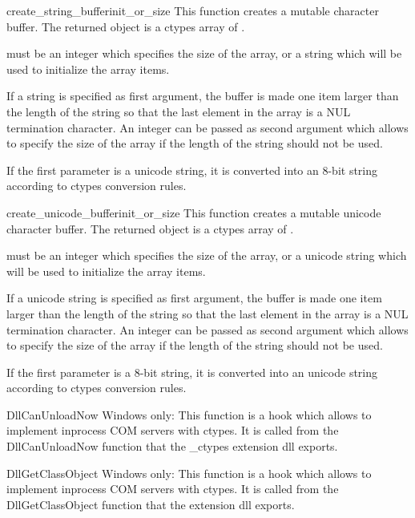 \begin{funcdesc}{create_string_buffer}{init_or_size}
This function creates a mutable character buffer. The returned
object is a ctypes array of .

 must be an integer which specifies the size of
the array, or a string which will be used to initialize the array
items.

If a string is specified as first argument, the buffer is made one
item larger than the length of the string so that the last element
in the array is a NUL termination character. An integer can be
passed as second argument which allows to specify the size of the
array if the length of the string should not be used.

If the first parameter is a unicode string, it is converted into
an 8-bit string according to ctypes conversion rules.
\end{funcdesc}

\begin{funcdesc}{create_unicode_buffer}{init_or_size}
This function creates a mutable unicode character buffer. The
returned object is a ctypes array of .

 must be an integer which specifies the size of
the array, or a unicode string which will be used to initialize
the array items.

If a unicode string is specified as first argument, the buffer is
made one item larger than the length of the string so that the
last element in the array is a NUL termination character. An
integer can be passed as second argument which allows to specify
the size of the array if the length of the string should not be
used.

If the first parameter is a 8-bit string, it is converted into an
unicode string according to ctypes conversion rules.
\end{funcdesc}

\begin{funcdesc}{DllCanUnloadNow}{}
Windows only: This function is a hook which allows to implement
inprocess COM servers with ctypes. It is called from the
DllCanUnloadNow function that the {\_}ctypes extension dll exports.
\end{funcdesc}

\begin{funcdesc}{DllGetClassObject}{}
Windows only: This function is a hook which allows to implement
inprocess COM servers with ctypes. It is called from the
DllGetClassObject function that the  extension dll exports.
\end{funcdesc}


